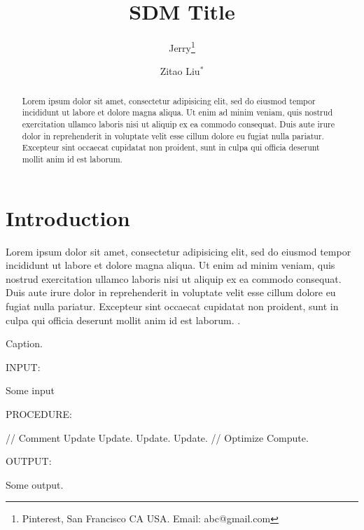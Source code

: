 \documentclass[twoside,leqno,twocolumn]{article}
\begin{document}

\title{\Large SDM Title}
\author{Jerry\thanks{Pinterest, San Francisco CA USA. Email: abc@gmail.com} \\
\and
Zitao Liu$^*$}
\date{}

\maketitle



\begin{abstract} \small\baselineskip=9pt 
Lorem ipsum dolor sit amet, consectetur adipisicing elit, sed do eiusmod
tempor incididunt ut labore et dolore magna aliqua. Ut enim ad minim veniam,
quis nostrud exercitation ullamco laboris nisi ut aliquip ex ea commodo
consequat. Duis aute irure dolor in reprehenderit in voluptate velit esse
cillum dolore eu fugiat nulla pariatur. Excepteur sint occaecat cupidatat non
proident, sunt in culpa qui officia deserunt mollit anim id est laborum.
\end{abstract}


\section{Introduction}
\label{sec:intro}

Lorem ipsum dolor sit amet, consectetur adipisicing elit, sed do eiusmod
tempor incididunt ut labore et dolore magna aliqua. Ut enim ad minim veniam,
quis nostrud exercitation ullamco laboris nisi ut aliquip ex ea commodo
consequat. Duis aute irure dolor in reprehenderit in voluptate velit esse
cillum dolore eu fugiat nulla pariatur. Excepteur sint occaecat cupidatat non
proident, sunt in culpa qui officia deserunt mollit anim id est laborum. \cite{liu2015regularized}.

\begin{algorithm}[!bpht]
\small \caption{Caption.}
\label{alg:summary}
{INPUT:}
\begin{compactitem}
\item Some input
\end{compactitem}
{PROCEDURE:}
\begin{algorithmic}[1]
\STATE // Comment
\REPEAT
   \STATE Update 
   		\STATE Update.
   				\STATE Update.
   		\ENDFOR
   		\STATE Update.
   \ENDFOR
{}
\STATE // Optimize
\STATE Compute.
\end{algorithmic}
{OUTPUT:}
\begin{compactitem}
\item Some output.
\end{compactitem}
\renewcommand*\arraystretch{1.0}
\end{algorithm}
\end{document}
